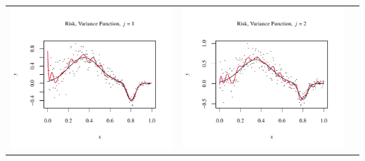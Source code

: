 \documentclass[11pt]{article}
\begin{document}
\begin{table}[h!]
  \begin{center}
    \renewcommand{\arraystretch}{1.5}
    \begin{tabular}{| >{\centering\arraybackslash}m{2.1in} |  >{\centering\arraybackslash}m{2.1in} |  >{\centering\arraybackslash}m{2.1in}|}
      \hline
      \includegraphics[width=1\linewidth,height=0.18\textheight]{Graphs/4/4/assignment5_a_4_4_1}&
      \includegraphics[width=1\linewidth,height=0.18\textheight]{Graphs/4/4/assignment5_a_4_4_2}&

\end{tabular}
\end{center}
\end{table}
\end{document}
